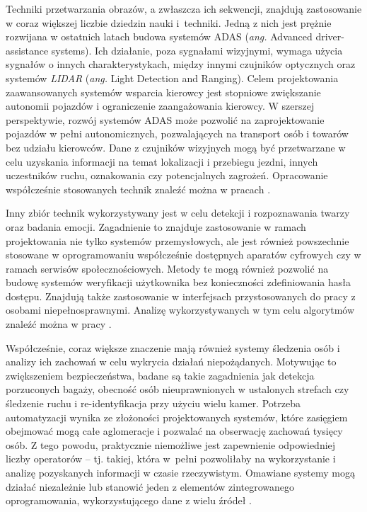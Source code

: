 Techniki przetwarzania obrazów, a zwłaszcza ich sekwencji, znajdują zastosowanie w coraz większej liczbie dziedzin nauki i~techniki.
Jedną z nich jest prężnie rozwijana w ostatnich latach budowa systemów ADAS (\emph{ang.} Advanced driver-assistance systems).
Ich działanie, poza sygnałami wizyjnymi, wymaga użycia sygnałów o innych charakterystykach, między innymi czujników optycznych oraz systemów \emph{LIDAR} (\emph{ang.} Light Detection and Ranging). %
Celem projektowania zaawansowanych systemów wsparcia kierowcy jest stopniowe zwiększanie autonomii pojazdów i ograniczenie zaangażowania kierowcy. W szerszej perspektywie, rozwój systemów ADAS może pozwolić na zaprojektowanie pojazdów w pełni autonomicznych, pozwalających na transport osób i towarów bez udziału kierowców.
Dane z czujników wizyjnych mogą być przetwarzane w celu uzyskania informacji na temat lokalizacji i przebiegu jezdni, innych uczestników ruchu, oznakowania czy potencjalnych zagrożeń. 
Opracowanie współcześnie stosowanych technik znaleźć można w pracach \cite{Bengler2014,Velez2017}.

Inny zbiór technik wykorzystywany jest w celu detekcji i rozpoznawania twarzy oraz badania emocji.
Zagadnienie to znajduje zastosowanie w ramach projektowania nie tylko systemów przemysłowych, ale jest również powszechnie stosowane w oprogramowaniu współcześnie dostępnych aparatów cyfrowych czy w ramach serwisów społecznościowych. 
Metody te mogą również pozwolić na budowę systemów weryfikacji użytkownika bez konieczności zdefiniowania hasła dostępu. 
Znajdują także zastosowanie w interfejsach przystosowanych do pracy z osobami niepełnosprawnymi.
Analizę wykorzystywanych w tym celu algorytmów znaleźć można w pracy \cite{Anil2016}.

Współcześnie, coraz większe znaczenie mają również systemy śledzenia osób i analizy ich zachowań w celu wykrycia działań niepożądanych.
Motywując to zwiększeniem bezpieczeństwa, badane są takie zagadnienia jak detekcja porzuconych bagaży, obecność osób nieuprawnionych w ustalonych strefach czy śledzenie ruchu i re-identyfikacja przy użyciu wielu kamer.
Potrzeba automatyzacji wynika ze złożoności projektowanych systemów, które zasięgiem obejmować mogą całe aglomeracje i pozwalać na obserwację zachowań tysięcy osób. 
Z tego powodu, praktycznie niemożliwe jest zapewnienie odpowiedniej liczby operatorów -- tj. takiej, która w~pełni pozwoliłaby na wykorzystanie i analizę pozyskanych informacji w czasie rzeczywistym. 
Omawiane systemy mogą działać niezależnie lub stanowić jeden z elementów zintegrowanego oprogramowania, wykorzystującego dane z wielu źródeł \cite{Sriram2016,Hussain2016,Gouo2015}.


